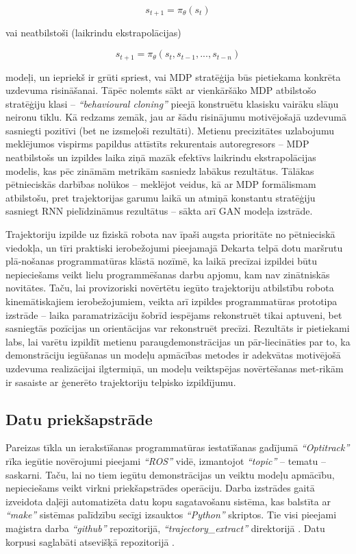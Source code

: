 \documentclass[12pt, a4paper]{article}
\numberwithin{equation}{section} %
\begin{document}
\begin{equation}
    s_{t+1} = \pi_{\theta}(s_t)
\end{equation}

vai neatbilstoši (laikrindu ekstrapolācijas)

\begin{equation}
    s_{t+1} = \pi_{\theta}(s_t, s_{t-1}, ..., s_{t-n})
\end{equation}

modeļi, un iepriekš ir grūti spriest, vai MDP stratēģija būs pietiekama konkrēta uzdevuma risināšanai. Tāpēc nolemts sākt ar vienkāršāko MDP atbilstošo stratēģiju klasi -- \textit{``behavioural cloning''} pieejā konstruētu klasisku vairāku slāņu neironu tīklu. Kā redzams zemāk, jau ar šādu risinājumu motivējošajā uzdevumā sasniegti pozitīvi (bet ne izsmeļoši rezultāti). Metienu precizitātes uzlabojumu meklējumos vispirms papildus attīstīts rekurentais autoregresors -- MDP neatbilstošs un izpildes laika ziņā mazāk efektīvs laikrindu ekstrapolācijas modelis, kas pēc zināmām metrikām sasniedz labākus rezultātus. Tālākas pētnieciskās darbības nolūkos -- meklējot veidus, kā ar MDP formālismam atbilstošu, pret trajektorijas garumu laikā un atmiņā konstantu stratēģiju sasniegt RNN pielīdzināmus rezultātus -- sākta arī GAN modeļa izstrāde.


Trajektoriju izpilde uz fiziskā robota nav īpaši augsta prioritāte no pētnieciskā viedokļa, un tīri praktiski ierobežojumi pieejamajā Dekarta telpā dotu maršrutu plā-nošanas programmatūras klāstā nozīmē, ka laikā precīzai izpildei būtu nepieciešams veikt lielu programmēšanas darbu apjomu, kam nav zinātniskās novitātes. Taču, lai provizoriski novērtētu iegūto trajektoriju atbilstību robota kinemātiskajiem ierobežojumiem, veikta arī izpildes programmatūras prototipa izstrāde -- laika paramatrizāciju šobrīd iespējams rekonstruēt tikai aptuveni, bet sasniegtās pozīcijas un orientācijas var rekonstruēt precīzi. Rezultāts ir pietiekami labs, lai varētu izpildīt metienu paraugdemonstrācijas un pār-liecināties par to, ka demonstrāciju iegūšanas un modeļu apmācības metodes ir adekvātas motivējošā uzdevuma realizācijai ilgtermiņā, un modeļu veiktspējas novērtēšanas met-rikām ir sasaiste ar ģenerēto trajektoriju telpisko izpildījumu.

\subsection{Datu priekšapstrāde}

Pareizas tīkla un ierakstīšanas programmatūras iestatīšanas gadījumā \textit{``Optitrack''} rīka iegūtie novērojumi pieejami \textit{``ROS''} vidē, izmantojot \textit{``topic''} -- tematu -- saskarni. Taču, lai no tiem iegūtu demonstrācijas un veiktu modeļu apmācību, nepieciešams veikt virkni priekšapstrādes operāciju. Darba izstrādes gaitā izveidota daļēji automatizēta datu kopu sagatavošanu sistēma, kas balstīta ar \textit{``make''} sistēmas palīdzību secīgi izsauktos \textit{``Python''} skriptos. Tie visi pieejami maģistra darba \textit{``github''} repozitorijā, \textit{``trajectory\_extract''} direktorijā \cite{md_repo}. Datu korpusi saglabāti atsevišķā repozitorijā \cite{md_data_repo}.
\end{document}
